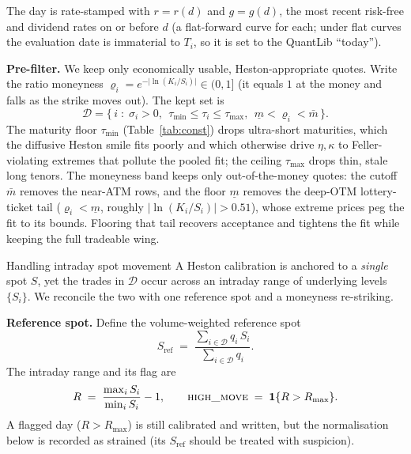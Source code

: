 \documentclass[a4paper, 11pt, reqno]{amsart}
\makeatletter
\def\section{\@startsection{section}{1}%
  \z@{.7\linespacing\@plus\linespacing}{.5\linespacing}%
  {\normalfont\bfseries\centering}}
\makeatother
\begin{document}
		The day is rate-stamped with $r=r(d)$ and $g=g(d)$, the most recent risk-free and
		dividend rates on or before $d$ (a flat-forward curve for each; under flat curves the
		evaluation date is immaterial to $T_i$, so it is set to the QuantLib ``today'').
	
		\textbf{Pre-filter.} We keep only economically usable, Heston-appropriate quotes. Write the
		ratio moneyness $\varrho_i = e^{-\lvert \ln(K_i/S_i)\rvert}\in(0,1]$ (it equals $1$ at the money
		and falls as the strike moves out). The kept set is
		\begin{equation}\label{eq:prefilter}
			\mathcal{D}
			= \bigl\{\, i \;:\; \sigma_i > 0,\ \ \tau_{\min} \le \tau_i \le \tau_{\max},\ \
			  \underline{m} < \varrho_i < \bar m \,\bigr\}.
		\end{equation}
		The maturity floor $\tau_{\min}$ (Table~\ref{tab:const}) drops ultra-short maturities, which the
		diffusive Heston smile fits poorly and which otherwise drive $\eta,\kappa$ to Feller-violating
		extremes that pollute the pooled fit; the ceiling $\tau_{\max}$ drops thin, stale long tenors.
		The moneyness band keeps only out-of-the-money quotes: the cutoff $\bar m$ removes the near-ATM
		rows, and the floor $\underline{m}$ removes the deep-OTM lottery-ticket tail
		($\varrho_i<\underline{m}$, roughly $\lvert\ln(K_i/S_i)\rvert>0.51$), whose extreme prices peg the
		fit to its bounds. Flooring that tail recovers acceptance and tightens the fit while keeping the
		full tradeable wing.
	
	\section{Handling intraday spot movement}\label{sec:spot}
		A Heston calibration is anchored to a \emph{single} spot $S$, yet the trades in
		$\mathcal{D}$ occur across an intraday range of underlying levels $\{S_i\}$. We reconcile
		the two with one reference spot and a moneyness re-striking.
	
		\textbf{Reference spot.} Define the volume-weighted reference spot
		\begin{equation}\label{eq:sref}
			S_{\mathrm{ref}} \;=\; \frac{\sum_{i\in\mathcal{D}} q_i\, S_i}{\sum_{i\in\mathcal{D}} q_i}.
		\end{equation}
		The intraday range and its flag are
		\begin{equation}\label{eq:highmove}
			R \;=\; \frac{\max_{i} S_i}{\min_{i} S_i} - 1,
			\qquad
			\textsc{high\_move} \;=\; \mathbf{1}\{ R > R_{\max} \}.
		\end{equation}
		A flagged day ($R>R_{\max}$) is still calibrated and written, but the normalisation below
		is recorded as strained (its $S_{\mathrm{ref}}$ should be treated with suspicion).
	
\end{document}
